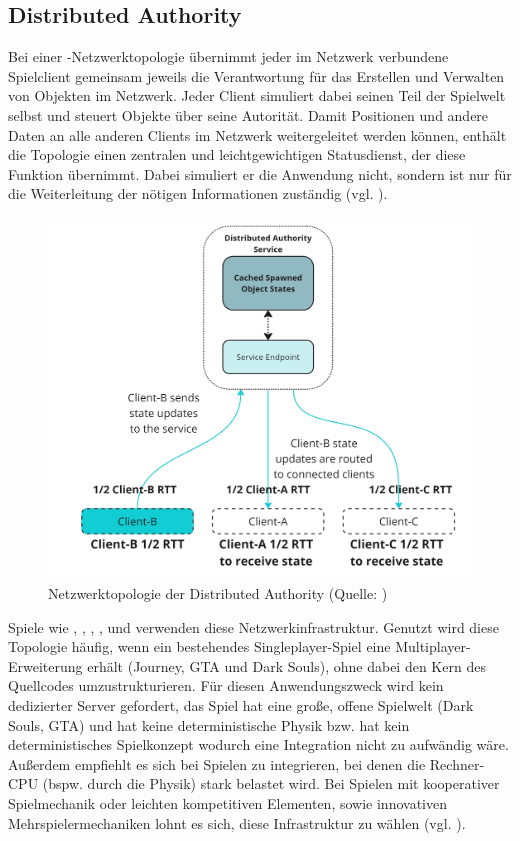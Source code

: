 \subsection{Distributed Authority}
Bei einer -Netzwerktopologie übernimmt jeder im Netzwerk verbundene Spielclient gemeinsam jeweils die Verantwortung für das Erstellen und Verwalten von Objekten im Netzwerk. Jeder Client simuliert dabei seinen Teil der Spielwelt selbst und steuert Objekte über seine Autorität.
Damit Positionen und andere Daten an alle anderen Clients im Netzwerk weitergeleitet werden können, enthält die Topologie einen zentralen und leichtgewichtigen Statusdienst, der diese Funktion übernimmt. Dabei simuliert er die Anwendung nicht, sondern ist nur für die Weiterleitung der nötigen Informationen zuständig (vgl. \cite{noauthor_distributed_2025}).

\begin{figure}[ht]
\centering
\includegraphics[width=1\linewidth]{content/pictures/distributed-authority-service.jpg}
\caption{Netzwerktopologie der Distributed Authority (Quelle: \cite{noauthor_distributed_2025})}
\label{fig:distributed_authority_topology}
\end{figure}

Spiele wie , , , ,  und  verwenden diese Netzwerkinfrastruktur. Genutzt wird diese Topologie häufig, wenn ein bestehendes Singleplayer-Spiel eine Multiplayer-Erweiterung erhält (Journey, GTA und Dark Souls), ohne dabei den Kern des Quellcodes umzustrukturieren. Für diesen Anwendungszweck wird kein dedizierter Server gefordert, das Spiel hat eine große, offene Spielwelt (Dark Souls, GTA) und hat keine deterministische Physik bzw. hat kein deterministisches Spielkonzept wodurch eine Integration nicht zu aufwändig wäre. Außerdem empfiehlt es sich bei Spielen zu integrieren, bei denen die Rechner-CPU (bspw. durch die Physik) stark belastet wird. Bei Spielen mit kooperativer Spielmechanik oder leichten kompetitiven Elementen, sowie innovativen Mehrspielermechaniken lohnt es sich, diese Infrastruktur zu wählen (vgl. \cite{noauthor_choosing_2024}).

